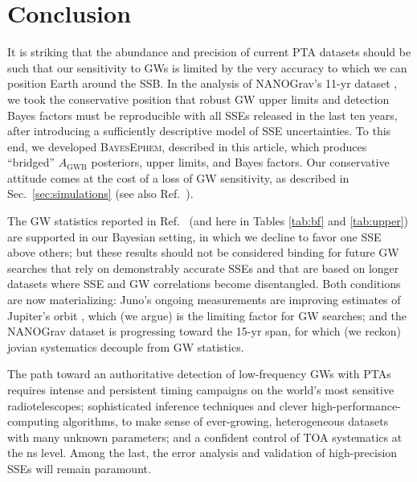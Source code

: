 \documentclass[reprint,
 amsmath,amssymb,
 aps,prd,floatfix,
]{revtex4-1}
\begin{document}
\section{Conclusion}
\label{sec:conclusion}

It is striking that the abundance and precision of current PTA datasets should be such that our sensitivity to GWs is limited by the very accuracy to which we can position Earth around the SSB.
In the analysis of NANOGrav's 11-yr dataset \cite{2018ApJ...859...47A}, we took the conservative position that robust GW upper limits and detection Bayes factors must be reproducible with all SSEs released in the last ten years, after introducing a sufficiently descriptive model of SSE uncertainties.
To this end, we developed \textsc{BayesEphem}, described in this article, which produces ``bridged'' $A_\mathrm{GWB}$ posteriors, upper limits, and Bayes factors.
Our conservative attitude comes at the cost of a loss of GW sensitivity, as described in Sec.\ \ref{sec:simulations} (see also Ref.\ \cite{2019ApJ...876...55R}).

The GW statistics reported in Ref.\ \cite{2018ApJ...859...47A} (and here in Tables \ref{tab:bf} and \ref{tab:upper}) are supported in our Bayesian setting, in which we decline to favor one SSE above others; but these results should not be considered binding for future GW searches that rely on demonstrably accurate SSEs and that are based on longer datasets where SSE and GW correlations become disentangled.
Both conditions are now materializing: Juno's ongoing measurements are improving estimates of Jupiter's orbit \cite{de438}, which (we argue) is the limiting factor for GW searches; and the NANOGrav dataset is progressing toward the 15-yr span, for which (we reckon) jovian systematics decouple from GW statistics.

The path toward an authoritative detection of low-frequency GWs with PTAs requires intense and persistent timing campaigns on the world's most sensitive radiotelescopes; 
sophisticated inference techniques and clever high-performance-computing algorithms, to make sense of ever-growing, heterogeneous datasets with many unknown parameters; and a confident control of TOA systematics at the ns level. Among the last, the error analysis and validation of high-precision SSEs will remain paramount.
\end{document}
